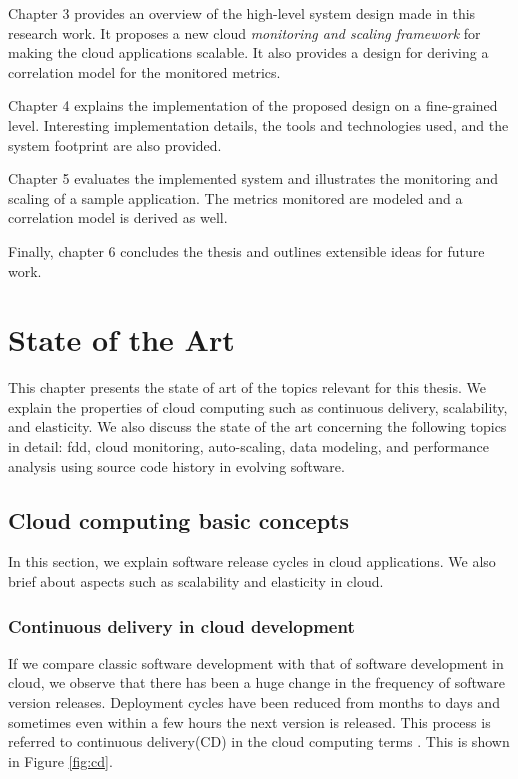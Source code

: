 \documentclass[article,type=msc,colorback,12pt,accentcolor=tud8b,table]{tudthesis}
\begin{document}
	Chapter 3 provides an overview of the high-level system design made in this research work. It proposes a new cloud \textit{monitoring and scaling framework} for making the cloud applications scalable. It also provides a design for deriving a correlation model for the monitored metrics.
	
	Chapter 4 explains the implementation of the proposed design on a fine-grained level. Interesting implementation details, the tools and technologies used, and the system footprint are also provided.  
	
	Chapter 5 evaluates the implemented system and illustrates the monitoring and scaling of a sample application. The metrics monitored are modeled and a correlation model is derived as well. 
	
	Finally, chapter 6 concludes the thesis and outlines extensible ideas for future work.


	\cleardoublepage
 
 \hfill 
 \section{State of the Art}
  \hfill \break
 	
	This chapter presents the state of art of the topics relevant for this thesis. We explain the properties of cloud computing such as continuous delivery, scalability, and elasticity. We also discuss the state of the art concerning the following topics in detail: \gls{fdd}, cloud monitoring, auto-scaling, data modeling, and performance analysis using source code history in evolving software.
	
		\subsection{Cloud computing basic concepts}
		
		In this section, we explain software release cycles in cloud applications. We also brief about aspects such as scalability and elasticity in cloud.
		
		\subsubsection{Continuous delivery in cloud development}
		If we compare classic software development with that of software development in cloud, we observe that there has been a huge change in the frequency of software version releases. Deployment cycles have been reduced from months to days and sometimes even within a few hours the next version is released. This process is referred to continuous delivery(CD) in the cloud computing terms \cite{humble2010continuous}. This is shown in Figure \ref{fig:cd}. 
		
\end{document}

